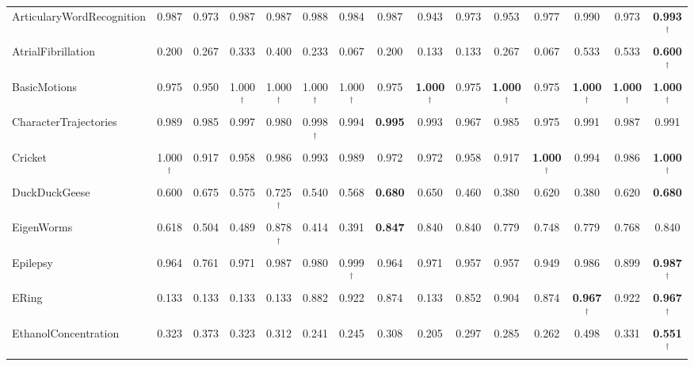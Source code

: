 \documentclass{article}
\begin{document}
\begin{table*}[t]
{\begin{tabular}{lcccccc|cccccccc}
ArticularyWordRecognition   & 0.987   & 0.973        & 0.987    & 0.987         & 0.988        & 0.984         & 0.987                 & 0.943          & 0.973        & 0.953            & 0.977  & 0.990    &  0.973 & \textbf{0.993}$^\dag$\\
AtrialFibrillation   & 0.200     & 0.267        & 0.333    & 0.400	        & 0.233	       & 0.067         & 0.200	               & 0.133	        & 0.133	       & 0.267	          & 0.067	  &  0.533    & 0.533 &  \textbf{0.600}$^\dag$\\
BasicMotions   & 0.975	  & 0.950	    & 1.000$^\dag$ & 1.000$^\dag$      & 1.000$^\dag$     & 1.000$^\dag$      & 0.975	             &\textbf{1.000}$^\dag$	& 0.975	       & \textbf{1.000}$^\dag$& 0.975	& \textbf{1.000}$^\dag$ & \textbf{1.000}$^\dag$      & \textbf{1.000}$^\dag$ \\
CharacterTrajectories  & 0.989	  & 0.985	     & 0.997	& 0.980	        & 0.998$^\dag$ & 0.994         & \textbf{0.995}        & 0.993	        & 0.967	       & 0.985	          & 0.975	 & 0.991    & 0.987     & 0.991 \\
Cricket   &1.000$^\dag$ & 0.917      	 & 0.958	& 0.986	        & 0.993	       & 0.989         & 0.972	               & 0.972	        & 0.958	       & 0.917	      &\textbf{1.000}$^\dag$  & 0.994  & 0.986  & \textbf{1.000}$^\dag$  \\
DuckDuckGeese   & 0.600     & 0.675	     & 0.575	& 0.725$^\dag$  & 0.540	       & 0.568         & \textbf{0.680}         & 0.650	        & 0.460	       & 0.380	          & 0.620	& 0.380    & 0.620   & \textbf{0.680}            \\
EigenWorms  & 0.618	  & 0.504	   	 & 0.489	& 0.878$^\dag$	& 0.414        & 0.391         & \textbf{0.847}        & 0.840	        & 0.840	       & 0.779	          & 0.748	& 0.779   & 0.768    & 0.840           \\
Epilepsy   & 0.964	  & 0.761	    	 & 0.971	& 0.987	        & 0.980	       & 0.999$^\dag$  & 0.964	        & 0.971	        & 0.957	       & 0.957	          & 0.949  & 0.986	 & 0.899     & \textbf{0.987}$^\dag$ \\
ERing   & 0.133	  & 0.133	    	 & 0.133	& 0.133	        & 0.882	       & 0.922         & 0.874	               & 0.133	        & 0.852	       & 0.904	          & 0.874	 & \textbf{0.967}$^\dag$   &  0.922  & \textbf{0.967}$^\dag$  \\
EthanolConcentration  & 0.323	  & 0.373	   	 & 0.323	& 0.312	        & 0.241	       & 0.245         & 0.308	               & 0.205	        & 0.297	       & 0.285	          & 0.262	 & 0.498    &       0.331  &  \textbf{0.551}$^\dag$ \\

\end{tabular}}
\end{table*}
\end{document}
